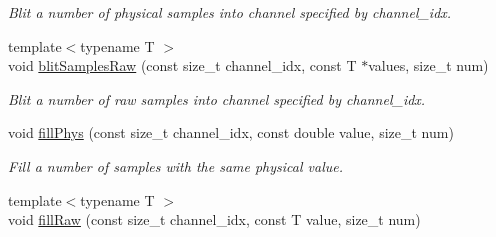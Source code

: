 \begin{DoxyCompactItemize}
\begin{DoxyCompactList}\small\item\em Blit a number of physical samples into channel specified by channel\_\-idx. \item\end{DoxyCompactList}\item 
\hypertarget{classgdf_1_1_record_buffer_a554260febe2dc7bc56bb07756eb4f939}{
{\footnotesize template$<$typename T $>$ }\\void \hyperlink{classgdf_1_1_record_buffer_a554260febe2dc7bc56bb07756eb4f939}{blitSamplesRaw} (const size\_\-t channel\_\-idx, const T $\ast$values, size\_\-t num)}
\label{classgdf_1_1_record_buffer_a554260febe2dc7bc56bb07756eb4f939}

\begin{DoxyCompactList}\small\item\em Blit a number of raw samples into channel specified by channel\_\-idx. \item\end{DoxyCompactList}\item 
\hypertarget{classgdf_1_1_record_buffer_a20c9d5f7a970779e191b1a0eb84b4386}{
void \hyperlink{classgdf_1_1_record_buffer_a20c9d5f7a970779e191b1a0eb84b4386}{fillPhys} (const size\_\-t channel\_\-idx, const double value, size\_\-t num)}
\label{classgdf_1_1_record_buffer_a20c9d5f7a970779e191b1a0eb84b4386}

\begin{DoxyCompactList}\small\item\em Fill a number of samples with the same physical value. \item\end{DoxyCompactList}\item 
\hypertarget{classgdf_1_1_record_buffer_a153e1eeac18b088a86bf913671e4879b}{
{\footnotesize template$<$typename T $>$ }\\void \hyperlink{classgdf_1_1_record_buffer_a153e1eeac18b088a86bf913671e4879b}{fillRaw} (const size\_\-t channel\_\-idx, const T value, size\_\-t num)}
\label{classgdf_1_1_record_buffer_a153e1eeac18b088a86bf913671e4879b}


\end{DoxyCompactItemize}
